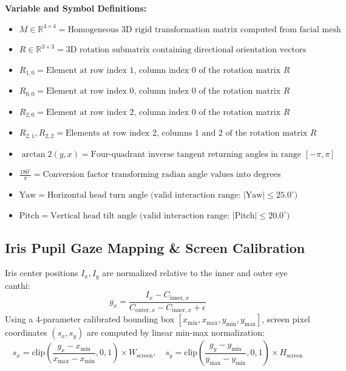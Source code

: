 \documentclass[11pt,a4paper]{article}
\begin{document}
\textbf{Variable and Symbol Definitions:}
\begin{itemize}
    \item $M \in \mathbb{R}^{4 \times 4} = \text{Homogeneous 3D rigid transformation matrix computed from facial mesh geometry}$
    \item $R \in \mathbb{R}^{3 \times 3} = \text{3D rotation submatrix containing directional orientation vectors}$
    \item $R_{1,0} = \text{Element at row index 1, column index 0 of the rotation matrix } R$
    \item $R_{0,0} = \text{Element at row index 0, column index 0 of the rotation matrix } R$
    \item $R_{2,0} = \text{Element at row index 2, column index 0 of the rotation matrix } R$
    \item $R_{2,1}, R_{2,2} = \text{Elements at row index 2, columns 1 and 2 of the rotation matrix } R$
    \item $\arctan2(y, x) = \text{Four-quadrant inverse tangent returning angles in range } [-\pi, \pi]$
    \item $\frac{180^\circ}{\pi} = \text{Conversion factor transforming radian angle values into degrees}$
    \item $\text{Yaw} = \text{Horizontal head turn angle (valid interaction range: } |\text{Yaw}| \le 25.0^\circ\text{)}$
    \item $\text{Pitch} = \text{Vertical head tilt angle (valid interaction range: } |\text{Pitch}| \le 20.0^\circ\text{)}$
\end{itemize}

\subsection{Iris Pupil Gaze Mapping \& Screen Calibration}
Iris center positions $I_x, I_y$ are normalized relative to the inner and outer eye canthi:
\begin{equation}
g_x = \frac{I_x - C_{\text{inner}, x}}{C_{\text{outer}, x} - C_{\text{inner}, x} + \epsilon}
\end{equation}
Using a 4-parameter calibrated bounding box $[x_{\min}, x_{\max}, y_{\min}, y_{\max}]$, screen pixel coordinates $(s_x, s_y)$ are computed by linear min-max normalization:
\begin{equation}
s_x = \text{clip}\left(\frac{g_x - x_{\min}}{x_{\max} - x_{\min}}, 0, 1\right) \times W_{\text{screen}}, \quad
s_y = \text{clip}\left(\frac{g_y - y_{\min}}{y_{\max} - y_{\min}}, 0, 1\right) \times H_{\text{screen}}
\end{equation}
\end{document}
